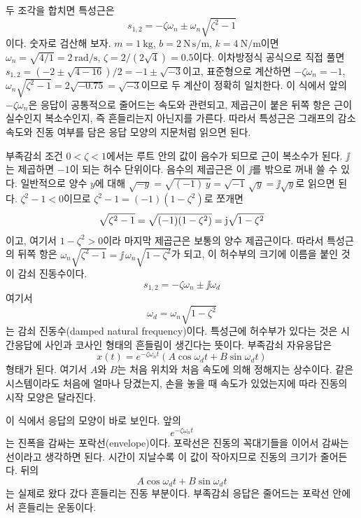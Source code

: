 두 조각을 합치면 특성근은
\begin{equation}
  s_{1,2}
  =
  -\zeta\omega_n
  \pm
  \omega_n\sqrt{\zeta^2-1}
\end{equation}
이다.
숫자로 검산해 보자.
$m=1~\mathrm{kg}$, $b=2~\mathrm{N\,s/m}$, $k=4~\mathrm{N/m}$이면 $\omega_n=\sqrt{4/1}=2~\mathrm{rad/s}$, $\zeta=2/(2\sqrt{4})=0.5$이다.
이차방정식 공식으로 직접 풀면 $s_{1,2}=(-2\pm\sqrt{4-16})/2=-1\pm\sqrt{-3}$이고, 표준형으로 계산하면 $-\zeta\omega_n=-1$, $\omega_n\sqrt{\zeta^2-1}=2\sqrt{-0.75}=\sqrt{-3}$이므로 두 계산이 정확히 일치한다.
%
이 식에서 앞의 $-\zeta\omega_n$은 응답이 공통적으로 줄어드는 속도와 관련되고, 제곱근이 붙은 뒤쪽 항은 근이 실수인지 복소수인지, 즉 흔들리는지 아닌지를 가른다.
따라서 특성근은 그래프의 감소 속도와 진동 여부를 담은 응답 모양의 지문처럼 읽으면 된다.

부족감쇠 조건 $0<\zeta<1$에서는 루트 안의 값이 음수가 되므로 근이 복소수가 된다.
$\jj$는 제곱하면 $-1$이 되는 허수 단위이다.
음수의 제곱근은 이 $\jj$를 밖으로 꺼내 쓸 수 있다.
일반적으로 양수 $y$에 대해 $\sqrt{-y}=\sqrt{(-1)\,y}=\sqrt{-1}\,\sqrt{y}=\jj\sqrt{y}$로 읽으면 된다.
$\zeta^2-1<0$이므로 $\zeta^2-1=(-1)(1-\zeta^2)$로 쪼개면
\[
  \sqrt{\zeta^2-1}
  =
  \sqrt{(-1)(1-\zeta^2)}
  =
  \jj\sqrt{1-\zeta^2}
\vmark{charroot-imaginary-unit-factorization}%
\]
이고, 여기서 $1-\zeta^2>0$이라 마지막 제곱근은 보통의 양수 제곱근이다.
따라서 특성근의 뒤쪽 항은 $\omega_n\sqrt{\zeta^2-1}=\jj\,\omega_n\sqrt{1-\zeta^2}$가 되고, 이 허수부의 크기에 이름을 붙인 것이 감쇠 진동수이다.
\begin{equation}
  s_{1,2}
  =
  -\zeta\omega_n
  \pm
  \jj \omega_d
\end{equation}
여기서
\begin{equation}
  \omega_d=\omega_n\sqrt{1-\zeta^2}
\end{equation}
는 감쇠 진동수(damped natural frequency)이다.
특성근에 허수부가 있다는 것은 시간응답에 사인과 코사인 형태의 흔들림이 생긴다는 뜻이다.
부족감쇠 자유응답은
\begin{equation}
  x(t)=e^{-\zeta\omega_n t}
  \left(A\cos\omega_d t+B\sin\omega_d t\right)
\end{equation}
형태가 된다.
여기서 $A$와 $B$는 처음 위치와 처음 속도에 의해 정해지는 상수이다.
같은 시스템이라도 처음에 얼마나 당겼는지, 손을 놓을 때 속도가 있었는지에 따라 진동의 시작 모양은 달라진다.

이 식에서 응답의 모양이 바로 보인다.
앞의
\begin{equation}
  e^{-\zeta\omega_n t}
\end{equation}
는 진폭을 감싸는 포락선(envelope)이다.
포락선은 진동의 꼭대기들을 이어서 감싸는 선이라고 생각하면 된다.
시간이 지날수록 이 값이 작아지므로 진동의 크기가 줄어든다.
뒤의
\begin{equation}
  A\cos\omega_d t+B\sin\omega_d t
\end{equation}
는 실제로 왔다 갔다 흔들리는 진동 부분이다.
부족감쇠 응답은 줄어드는 포락선 안에서 흔들리는 운동이다.

